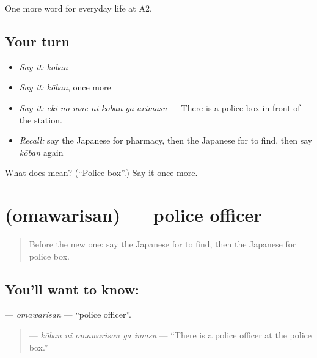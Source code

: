 \begin{grammarlens}[title={What you've built}]
One more word for everyday life at A2.
\end{grammarlens}

\subsection*{Your turn}
\begin{itemize}
\raggedright
  \item \emph{Say it:} \emph{kōban}
  \item \emph{Say it:} \emph{kōban}, once more
  \item \emph{Say it:} \emph{eki no mae ni kōban ga arimasu} — There is a police box in front of the station.
  \item \emph{Recall:} say the Japanese for pharmacy, then the Japanese for to find, then say \emph{kōban} again
\end{itemize}

\begin{tcolorbox}[breakable,colback=teal!4,colframe=teal!35!black,title={Before you move on}]
What does  mean? (\textquotedblleft{}Police box\textquotedblright{}.) Say it once more.
\end{tcolorbox}
\section[\texorpdfstring{\ja{おまわりさん} (omawarisan)}{おまわりさん (omawarisan)}]{ (omawarisan) — police officer}

\label{lesson:JA-C192-omawarisan}



\begin{quote}
Before the new one: say the Japanese for to find, then the Japanese for police box.
\end{quote}

\subsection*{You'll want to know: }
\textbf{} — \emph{omawarisan} — \textquotedblleft{}police officer\textquotedblright{}.

\begin{quote}
\textbf{  } — \emph{kōban ni omawarisan ga imasu} — \textquotedblleft{}There is a police officer at the police box.\textquotedblright{}
\end{quote}

